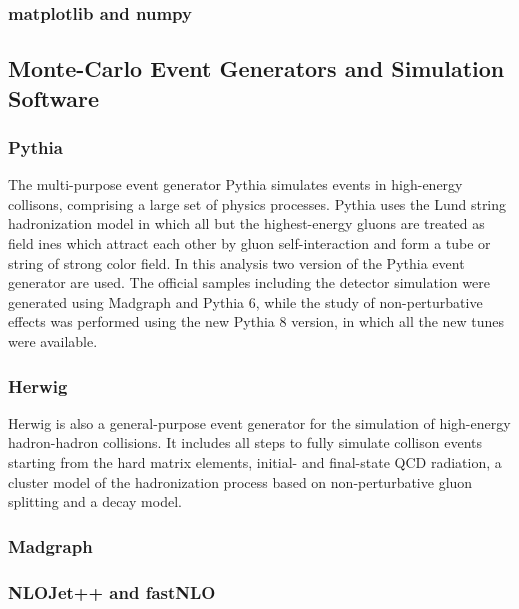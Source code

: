 \subsubsection{matplotlib and numpy}



\subsection{Monte-Carlo Event Generators and Simulation Software}
\label{subsection:mc_generators}

\subsubsection{Pythia}

The multi-purpose event generator Pythia simulates events in high-energy
collisons, comprising a large set of physics processes. Pythia uses the Lund
string hadronization model in which all but the highest-energy gluons are
treated as field ines which attract each other by gluon self-interaction and
form a tube or string of strong color field. In this analysis two version of the
Pythia event generator are used. The official samples including the detector
simulation were generated using Madgraph and Pythia 6, while the study of
non-perturbative effects was performed using the new Pythia 8 version, in which
all the new tunes were available. 

\subsubsection{Herwig}

Herwig is also a general-purpose event generator for the simulation of
high-energy hadron-hadron collisions. It includes all steps to fully simulate
collison events starting from the hard matrix elements, initial- and final-state
QCD radiation, a cluster model of the hadronization process based on
non-perturbative gluon splitting and a decay model. 


\subsubsection{Madgraph}

\subsubsection{NLOJet++ and fastNLO}
\label{sec:nlojetpp}

